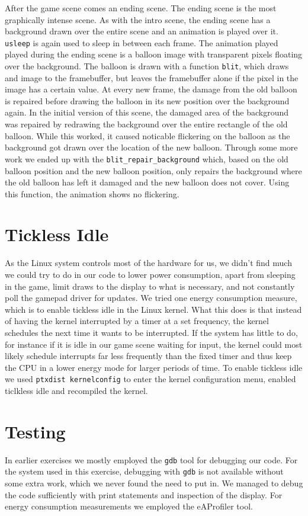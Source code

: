 After the game scene comes an ending scene. The ending scene is the most
graphically intense scene. As with the intro scene, the ending scene has a
background drawn over the entire scene and an animation is played over it.
\texttt{usleep} is again used to sleep in between each frame. The animation
played played during the ending scene is a balloon image with transparent pixels
floating over the background. The balloon is drawn with a function
\texttt{blit}, which draws and image to the framebuffer, but leaves the
framebuffer alone if the pixel in the image has a certain value. At every new
frame, the damage from the old balloon is repaired before drawing the balloon in
its new position over the background again. In the initial version of this
scene, the damaged area of the background was repaired by redrawing the
background over the entire rectangle of the old balloon. While this worked, it
caused noticable flickering on the balloon as the background got drawn over the
location of the new balloon. Through some more work we ended up with the
\texttt{blit\_repair\_background} which, based on the old balloon position and
the new balloon position, only repairs the background where the old balloon has
left it damaged and the new balloon does not cover. Using this function, the
animation shows no flickering.

\section{Tickless Idle}

As the Linux system controls most of the hardware for us, we didn't find much we
could try to do in our code to lower power consumption, apart from sleeping in
the game, limit draws to the display to what is necessary, and not constantly
poll the gamepad driver for updates. We tried one energy consumption measure,
which is to enable tickless idle in the Linux kernel. What this does is that
instead of having the kernel interrupted by a timer at a set frequency, the
kernel schedules the next time it wants to be interrupted. If the system has
little to do, for instance if it is idle in our game scene waiting for input,
the kernel could most likely schedule interrupts far less frequently than the
fixed timer and thus keep the CPU in a lower energy mode for larger periods of
time. To enable tickless idle we used \texttt{ptxdist kernelconfig} to enter the
kernel configuration menu, enabled ticlkless idle and recompiled the kernel.

\section{Testing}

In earlier exercises we mostly employed the \texttt{gdb} tool for debugging our
code. For the system used in this exercise, debugging with \texttt{gdb} is not
available without some extra work, which we never found the need to put in. We
managed to debug the code sufficiently with print statements and inspection of
the display. For energy consumption measurements we employed the eAProfiler
tool.
